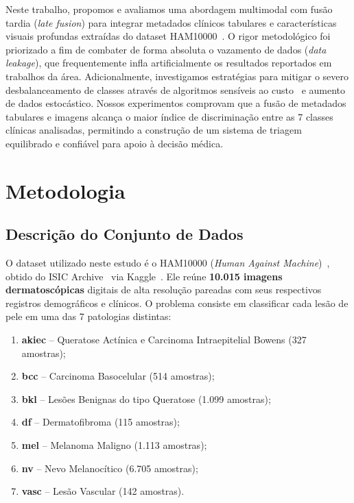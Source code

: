 \documentclass[10pt,twocolumn,letterpaper]{article}
\begin{document}
Neste trabalho, propomos e avaliamos uma abordagem multimodal com fusão tardia (\emph{late fusion}) para integrar metadados clínicos tabulares e características visuais profundas extraídas do dataset HAM10000~\cite{tschandl2018ham10000}. O rigor metodológico foi priorizado a fim de combater de forma absoluta o vazamento de dados (\emph{data leakage}), que frequentemente infla artificialmente os resultados reportados em trabalhos da área. Adicionalmente, investigamos estratégias para mitigar o severo desbalanceamento de classes através de algoritmos sensíveis ao custo~\cite{elkan2001foundations} e aumento de dados estocástico. Nossos experimentos comprovam que a fusão de metadados tabulares e imagens alcança o maior índice de discriminação entre as 7 classes clínicas analisadas, permitindo a construção de um sistema de triagem equilibrado e confiável para apoio à decisão médica.

\section{Metodologia}
\label{sec:metodo}

\subsection{Descrição do Conjunto de Dados}
O dataset utilizado neste estudo é o HAM10000 (\emph{Human Against Machine})~\cite{tschandl2018ham10000}, obtido do ISIC Archive~\cite{isicarchive} via Kaggle~\cite{tschandlkaggle}. Ele reúne \textbf{10.015 imagens dermatoscópicas} digitais de alta resolução pareadas com seus respectivos registros demográficos e clínicos. O problema consiste em classificar cada lesão de pele em uma das 7 patologias distintas:
\begin{enumerate}
    \item \textbf{akiec} -- Queratose Actínica e Carcinoma Intraepitelial Bowens (327 amostras);
    \item \textbf{bcc} -- Carcinoma Basocelular (514 amostras);
    \item \textbf{bkl} -- Lesões Benignas do tipo Queratose (1.099 amostras);
    \item \textbf{df} -- Dermatofibroma (115 amostras);
    \item \textbf{mel} -- Melanoma Maligno (1.113 amostras);
    \item \textbf{nv} -- Nevo Melanocítico (6.705 amostras);
    \item \textbf{vasc} -- Lesão Vascular (142 amostras).
\end{enumerate}
\end{document}
